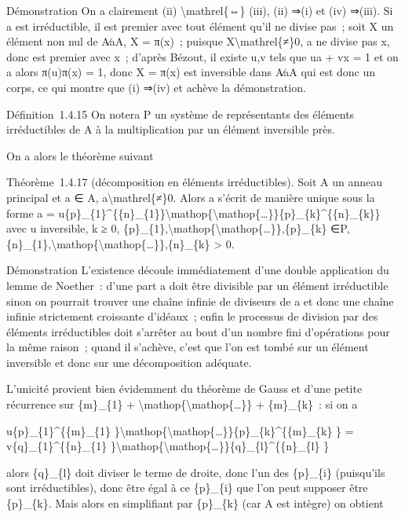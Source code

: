 \documentclass[]{article}
\begin{document}
Démonstration On a clairement (ii) \textbackslash{}mathrel\{⇔\} (iii),
(ii) ⇒(i) et (iv) ⇒(iii). Si a est irréductible, il est premier avec
tout élément qu'il ne divise pas~; soit X un élément non nul de A∕aA, X
= π(x)~; puisque X\textbackslash{}mathrel\{≠\}0, a ne divise pas x, donc
est premier avec x~; d'après Bézout, il existe u,v tels que ua + vx = 1
et on a alors π(u)π(x) = 1, donc X = π(x) est inversible dans A∕aA qui
est donc un corps, ce qui montre que (i) ⇒(iv) et achève la
démonstration.

Définition~1.4.15 On notera P un système de représentants des éléments
irréductibles de A à la multiplication par un élément inversible près.

On a alors le théorème suivant

Théorème~1.4.17 (décomposition en éléments irréductibles). Soit A un
anneau principal et a ∈ A, a\textbackslash{}mathrel\{≠\}0. Alors a
s'écrit de manière unique sous la forme a =
u\{p\}\_\{1\}\^{}\{\{n\}\_\{1\}\}\textbackslash{}mathop\{\textbackslash{}mathop\{\ldots{}\}\}\{p\}\_\{k\}\^{}\{\{n\}\_\{k\}\}
avec u inversible, k ≥ 0,
\{p\}\_\{1\},\textbackslash{}mathop\{\textbackslash{}mathop\{\ldots{}\}\},\{p\}\_\{k\}
∈P,
\{n\}\_\{1\},\textbackslash{}mathop\{\textbackslash{}mathop\{\ldots{}\}\},\{n\}\_\{k\}
\textgreater{} 0.

Démonstration L'existence découle immédiatement d'une double application
du lemme de Noether~: d'une part a doit être divisible par un élément
irréductible sinon on pourrait trouver une chaîne infinie de diviseurs
de a et donc une chaîne infinie strictement croissante d'idéaux~; enfin
le processus de division par des éléments irréductibles doit s'arrêter
au bout d'un nombre fini d'opérations pour la même raison~; quand il
s'achève, c'est que l'on est tombé sur un élément inversible et donc sur
une décomposition adéquate.

L'unicité provient bien évidemment du théorème de Gauss et d'une petite
récurrence sur \{m\}\_\{1\} +
\textbackslash{}mathop\{\textbackslash{}mathop\{\ldots{}\}\} +
\{m\}\_\{k\}~: si on a

u\{p\}\_\{1\}\^{}\{\{m\}\_\{1\}
\}\textbackslash{}mathop\{\textbackslash{}mathop\{\ldots{}\}\}\{p\}\_\{k\}\^{}\{\{m\}\_\{k\}
\} = v\{q\}\_\{1\}\^{}\{\{n\}\_\{1\}
\}\textbackslash{}mathop\{\textbackslash{}mathop\{\ldots{}\}\}\{q\}\_\{l\}\^{}\{\{n\}\_\{l\}
\}

alors \{q\}\_\{l\} doit diviser le terme de droite, donc l'un des
\{p\}\_\{i\} (puisqu'ils sont irréductibles), donc être égal à ce
\{p\}\_\{i\} que l'on peut supposer être \{p\}\_\{k\}. Mais alors en
simplifiant par \{p\}\_\{k\} (car A est intègre) on obtient
\end{document}
